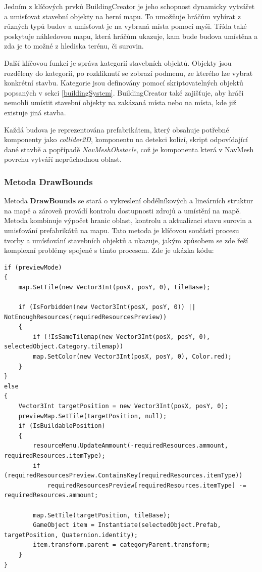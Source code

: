 Jedním z klíčových prvků BuildingCreator je jeho schopnost dynamicky vytvářet a umisťovat stavební objekty na herní mapu. To umožňuje hráčům vybírat z různých typů budov a umisťovat je na vybraná místa pomocí myši. Třída také poskytuje náhledovou mapu, která hráčům ukazuje, kam bude budova umístěna a zda je to možné z hlediska terénu, či surovin.

Další klíčovou funkcí je správa kategorií stavebních objektů. Objekty jsou rozděleny do kategorií, po rozkliknutí se zobrazí podmenu, ze kterého lze vybrat konkrétní stavbu. Kategorie jsou definovány pomocí skriptovatelných objektů popsaných v sekci \ref{buildingSystem}. BuildingCreator také zajišťuje, aby hráči nemohli umístit stavební objekty na zakázaná místa nebo na místa, kde již existuje jiná stavba. 

Každá budova je reprezentována prefabrikátem, který obsahuje potřebné komponenty jako \textit{collider2D}, komponentu na detekci kolizí, skript odpovídající dané stavbě a popřípadě \textit{NavMeshObstacle}, což je komponenta která v NavMesh povrchu vytváří neprůchodnou oblast.

\subsubsection{Metoda DrawBounds}
Metoda \textbf{DrawBounds} se stará o vykreslení obdélníkových a lineárních struktur na mapě a zároveň provádí kontrolu dostupnosti zdrojů a umístění na mapě. Metoda kombinuje výpočet hranic oblast, kontrolu a aktualizaci stavu surovin a umisťování prefabrikátů na mapu. Tato metoda je klíčovou součástí procesu tvorby a umísťování stavebních objektů a ukazuje, jakým způsobem se zde řeší komplexní problémy spojené s tímto procesem. Zde je ukázka kódu:

\begin{lstlisting}
if (previewMode)
{
	map.SetTile(new Vector3Int(posX, posY, 0), tileBase);
	
	if (IsForbidden(new Vector3Int(posX, posY, 0)) || NotEnoughResources(requiredResourcesPreview))
	{
		if (!IsSameTilemap(new Vector3Int(posX, posY, 0), selectedObject.Category.tilemap))
		map.SetColor(new Vector3Int(posX, posY, 0), Color.red);
	}
}
else
{
	Vector3Int targetPosition = new Vector3Int(posX, posY, 0);
	previewMap.SetTile(targetPosition, null);	
	if (IsBuildablePosition)
	{
		resourceMenu.UpdateAmmount(-requiredResources.ammount, requiredResources.itemType);
		if (requiredResourcesPreview.ContainsKey(requiredResources.itemType))
			requiredResourcesPreview[requiredResources.itemType] -= requiredResources.ammount;
		
		map.SetTile(targetPosition, tileBase);
		GameObject item = Instantiate(selectedObject.Prefab, targetPosition, Quaternion.identity);
		item.transform.parent = categoryParent.transform;
	}
}
\end{lstlisting}

